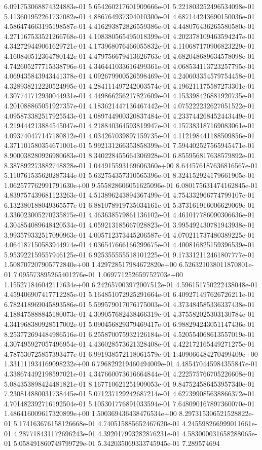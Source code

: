 6.091753068874324883e-01	5.654260217601909666e-01	5.221803252496534098e-01	5.113601952261737082e-01	4.886764937394010300e-01	4.687144243690150036e-01	4.586474663195198587e-01	4.416293872826559386e-01	4.448076436265580580e-01	4.271167533521266768e-01	4.108380565495018399e-01	4.202378109463594247e-01	4.342729449061629721e-01	4.173968076466055832e-01	4.110687170906823229e-01	4.160840512364780142e-01	4.479756679413626763e-01	4.682048689634578098e-01	4.742605277715338796e-01	4.346441033616499361e-01	4.068534113723257795e-01	4.069435843943441378e-01	4.092679900526598469e-01	4.240603354579754458e-01	4.328938212220524995e-01	4.284111497242003574e-01	4.196211175587273301e-01	4.307741712930044931e-01	4.449866256217827609e-01	4.153398426881920735e-01	4.201088865051927357e-01	4.183621447136467442e-01	4.075222232627051522e-01	4.095873382517925543e-01	4.089744900320837484e-01	4.233744268452443449e-01	4.219444213884545047e-01	4.218840364593819947e-01	4.157383187169083061e-01	4.093740477147180812e-01	4.034267039897159735e-01	4.112198441188509856e-01	4.371101580354671001e-01	5.992131266353858399e-01	7.594402527565945471e-01	8.900038280926980683e-01	8.340228455664306928e-01	6.855956817638579892e-01	8.387892273882748828e-01	1.044915593169606360e+00	8.644576187636816567e-01	5.110761535620287344e-01	5.632754357310565396e-01	8.324152924179661905e-01	1.062577762991791630e+00	9.555828606051625096e-01	6.080175631474162845e-01	4.839757439681123263e-01	4.513896243894367499e-01	4.754332966774799107e-01	6.132380188049365577e-01	6.881078919735034161e-01	5.373161916006629069e-01	4.336023005270235875e-01	4.463638579861136102e-01	4.461017786090306636e-01	4.304854089648420534e-01	4.059213185667028823e-01	3.995492430781943938e-01	3.993579332517090963e-01	4.005712373445206587e-01	4.070211737480389225e-01	4.064187150583944974e-01	4.036547666166299675e-01	4.400816825159396539e-01	5.953922159557946125e-01	6.925355555518101225e-01	9.173312112461807777e-01	1.508707207905772840e+00	1.429728517984672820e+00	6.526321038011870801e-01	7.095573895265401276e-01	1.069771252659752703e+00	1.155271846042117634e+00	6.242657003972007512e-01	4.596151750222438048e-01	4.459406907417712285e-01	5.164851072925291664e-01	6.409271497626726211e-01	6.782418969045893586e-01	5.599579017076175003e-01	4.373484585336337438e-01	4.188475888845180073e-01	4.309057682438466319e-01	4.375582025303130784e-01	4.341968380928517002e-01	5.090456829379469417e-01	6.988294243051147436e-01	8.253772694484986516e-01	6.255870075932126184e-01	4.520554068613557019e-01	4.307495927057496954e-01	4.436028573621328408e-01	4.422172165449271275e-01	4.787530725857393477e-01	6.991938572118061579e-01	1.409066484270499409e+00	1.331111934169098232e+00	6.796829219460494009e-01	4.485470445984355847e-01	4.338674492198597021e-01	4.347660073616664844e-01	4.222575766705226608e-01	5.084353898424481821e-01	8.167710621251909053e-01	9.847524586453957340e-01	7.230814880031738445e-01	5.071237129242687214e-01	4.627399085638866372e-01	4.701482392716192504e-01	5.105301776891033594e-01	7.648090167897360070e-01	1.486416009617320899e+00	1.500369436438476534e+00	8.297315306521528822e-01	5.174163676158126668e-01	4.740515885652467620e-01	4.245598266999011661e-01	4.287718431172696243e-01	4.392017993282876231e-01	4.583000031658288065e-01	5.058491860749799729e-01	5.342035069333745945e-01	7.289574694